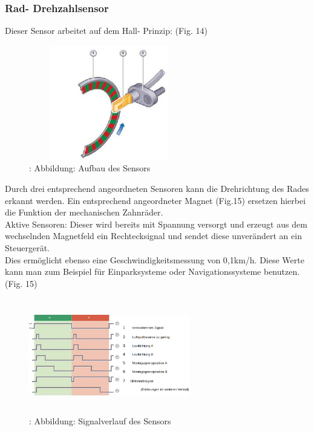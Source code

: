 			
			\subsubsection{Rad- Drehzahlsensor}
			
				Dieser Sensor arbeitet auf dem Hall- Prinzip: (Fig. 14)
				\begin{figure}
					\centering
					\includegraphics[width=7cm, height=5cm] {radsensor.png}
					\caption {\cite{TS26}: Abbildung: Aufbau des Sensors}
				\end{figure}
			
				\begin{flushleft}
					Durch drei entsprechend angeordneten Sensoren kann die Drehrichtung des Rades erkannt werden. Ein entsprechend angeordneter Magnet (Fig.15) ersetzen hierbei die Funktion der mechanischen Zahnräder.\\
					Aktive Sensoren: Dieser wird bereits mit Spannung versorgt und erzeugt aus dem wechselnden Magnetfeld ein Rechtecksignal und sendet diese unverändert an ein Steuergerät.\\
					Dies ermöglicht ebenso eine Geschwindigkeitsmessung von 0,1km/h. Diese Werte kann man zum Beispiel für Einparksysteme oder Navigationssysteme benutzen.\cite{TS27}
					(Fig. 15)
				\end{flushleft}

				\begin{figure}
					\centering
					\includegraphics[width=7cm, height=5cm] {signalverlauf_hall.png}
					\caption {\cite{TS28}: Abbildung: Signalverlauf des Sensors}
				\end{figure}

